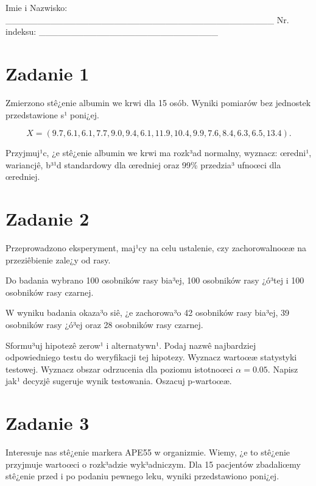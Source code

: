 \documentclass[a4paper,12pt]{article}
\begin{document}
 Imie i Nazwisko: \_\_\_\_\_\_\_\_\_\_\_\_\_\_\_\_\_\_\_\_\_\_\_\_\_\_\_\_\_\_\_\_\_\_\_\_\_\_\_\_\_\_ Nr. indeksu: \_\_\_\_\_\_\_\_\_\_\_\_\_\_\_\_\_\_\_\_\_\_\_\_\_\_\_\_ 
 \section*{Zadanie 1}
     
     Zmierzono stê¿enie albumin we krwi dla 15 osób. 
     Wyniki pomiarów bez jednostek przedstawione s¹ poni¿ej. 
     
     \noindent $$X=(  9.7,  6.1,  6.1,  7.7,  9.0,  9.4,  6.1, 11.9, 10.4,  9.9,  7.6,  8.4,  6.3,  6.5, 13.4 ).$$
     
     Przyjmuj¹c, ¿e stê¿enie albumin we krwi ma rozk³ad normalny, 
     wyznacz: œredni¹, wariancjê, b³¹d standardowy dla œredniej oraz 99\% przedzia³ ufnoœci dla œredniej. \vspace{1cm} 

  \section*{Zadanie 2}
     
  Przeprowadzono eksperyment, maj¹cy na celu ustalenie, czy zachorowalnoœæ na przeziêbienie zale¿y od rasy.
  
  Do badania wybrano 100 osobników rasy bia³ej, 100 osobników rasy ¿ó³tej i 100 osobników rasy czarnej. 
  
  W wyniku badania okaza³o siê, ¿e zachorowa³o 42 osobników rasy bia³ej, 39 osobników rasy ¿ó³ej oraz 28 osobników rasy czarnej. 
  
  Sformu³uj hipotezê zerow¹ i alternatywn¹. 
  Podaj nazwê najbardziej odpowiedniego testu do weryfikacji tej hipotezy. 
  Wyznacz wartoœæ statystyki testowej. 
  Wyznacz obszar odrzucenia dla poziomu istotnoœci $\alpha=0.05$. 
  Napisz jak¹ decyzjê sugeruje wynik testowania. Oszacuj p-wartoœæ. \vspace{1cm} 

  \section*{Zadanie 3}
     
  Interesuje nas stê¿enie markera APE55  w organizmie. 
  Wiemy, ¿e to stê¿enie przyjmuje wartoœci o rozk³adzie wyk³adniczym. 
  Dla 15 pacjentów zbadaliœmy stê¿enie przed i po podaniu pewnego leku, 
  wyniki przedstawiono poni¿ej.
  
\end{document}
